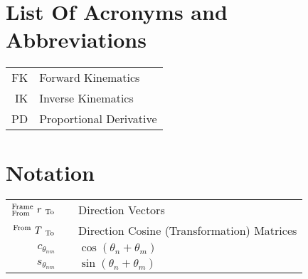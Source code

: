 

\normalem

{\tableofcontents\clearpage\listoffigures\listoftables}
\clearpage
\newpage
\section*{List Of Acronyms and Abbreviations}
\begin{tabular}{rl}
  FK & Forward Kinematics \\
  IK & Inverse Kinematics  \\
  PD & Proportional Derivative \\
\end{tabular}

\section*{Notation}\vspace{-\baselineskip}
\renewcommand{\arraystretch}{2.25}
\begin{tabular}{rcl}
\large%
\(
{}^{\text{\scriptsize Frame}}_{\text{\scriptsize From}}~{r}~_{\text{\scriptsize To}}
\)\normalsize && Direction Vectors\\
\(
{}^{\text{\scriptsize From}}~{T}~_{\text{\scriptsize To}}
\)\normalsize && Direction Cosine (Transformation) Matrices \\
\(c_{\theta_{nm}}\)& & \( \cos(\theta_n + \theta_m)\)\\
\(s_{\theta_{nm}}\)& & \( \sin(\theta_n + \theta_m)\) \\
\end{tabular}
\renewcommand{\arraystretch}{1}
\newpage

